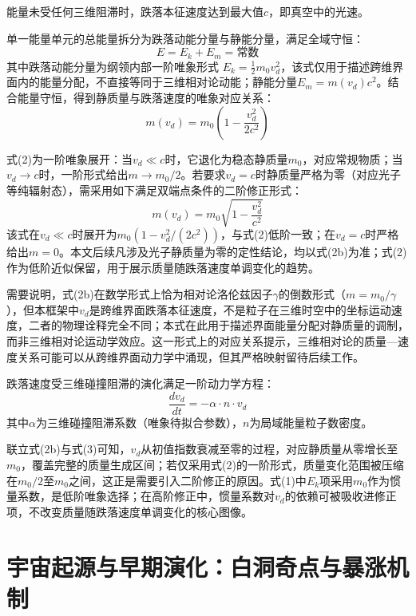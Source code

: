 \documentclass[UTF8]{csoarticle}
\begin{document}
能量未受任何三维阻滞时，跌落本征速度达到最大值$c$，即真空中的光速。

单一能量单元的总能量拆分为跌落动能分量与静能分量，满足全域守恒：
\begin{equation}
E = E_k + E_m = \text{常数}
\end{equation}
其中跌落动能分量为纲领内部一阶唯象形式 $E_k = \frac{1}{2} m_0 v_d^2$，该式仅用于描述跨维界面内的能量分配，不直接等同于三维相对论动能；静能分量$E_m = m(v_d) c^2$。结合能量守恒，得到静质量与跌落速度的唯象对应关系：
\begin{equation}
m(v_d) = m_0 \left( 1 - \frac{v_d^2}{2c^2} \right)
\end{equation}

式(2)为一阶唯象展开：当$v_d \ll c$时，它退化为稳态静质量$m_0$，对应常规物质；当$v_d \to c$时，一阶形式给出$m \to m_0/2$。若要求$v_d=c$时静质量严格为零（对应光子等纯辐射态），需采用如下满足双端点条件的二阶修正形式：
\begin{equation*}
m(v_d) = m_0 \sqrt{1 - \frac{v_d^2}{c^2}}
\tag{2b}
\end{equation*}
该式在$v_d \ll c$时展开为$m_0\left(1 - v_d^2/(2c^2)\right)$，与式(2)低阶一致；在$v_d=c$时严格给出$m=0$。本文后续凡涉及光子静质量为零的定性结论，均以式(2b)为准；式(2)作为低阶近似保留，用于展示质量随跌落速度单调变化的趋势。

需要说明，式(2b)在数学形式上恰为相对论洛伦兹因子$\gamma$的倒数形式（$m=m_0/\gamma$），但本框架中$v_d$是跨维界面跌落本征速度，不是粒子在三维时空中的坐标运动速度，二者的物理诠释完全不同；本式在此用于描述界面能量分配对静质量的调制，而非三维相对论运动学效应。这一形式上的对应关系提示，三维相对论的质量—速度关系可能可以从跨维界面动力学中涌现，但其严格映射留待后续工作。

跌落速度受三维碰撞阻滞的演化满足一阶动力学方程：
\begin{equation}
\frac{dv_d}{dt} = -\alpha \cdot n \cdot v_d
\end{equation}
其中$\alpha$为三维碰撞阻滞系数（唯象待拟合参数），$n$为局域能量粒子数密度。

联立式(2b)与式(3)可知，$v_d$从初值指数衰减至零的过程，对应静质量从零增长至$m_0$，覆盖完整的质量生成区间；若仅采用式(2)的一阶形式，质量变化范围被压缩在$m_0/2$至$m_0$之间，这正是需要引入二阶修正的原因。式(1)中$E_k$项采用$m_0$作为惯量系数，是低阶唯象选择；在高阶修正中，惯量系数对$v_d$的依赖可被吸收进修正项，不改变质量随跌落速度单调变化的核心图像。

\section{宇宙起源与早期演化：白洞奇点与暴涨机制}
\end{document}
